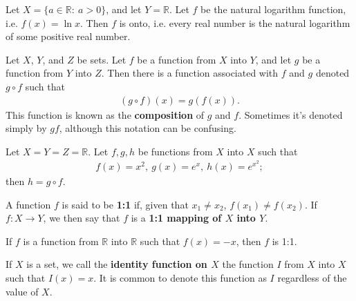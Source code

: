 \documentclass[12pt]{article}
\begin{document}
\begin{exm}
  Let $X = \{a \in \mathbb{R}:\ a > 0\}$, and let $Y = \mathbb{R}$. Let $f$ be the
  natural logarithm function, i.e. $f(x) = \ln x$. Then $f$ is onto, i.e. every real
  number is the natural logarithm of some positive real number.
\end{exm}

\begin{defn}
  Let $X$, $Y$, and $Z$ be sets. Let $f$ be a function from $X$ into $Y$, and let $g$
  be a function from $Y$ into $Z$. Then there is a function associated with $f$ and
  $g$ denoted $g \circ f$ such that
  \begin{align*}
    (g \circ f)(x) = g(f(x)).
  \end{align*}
  This function is known as the \textbf{composition} of $g$ and $f$. Sometimes it's
  denoted simply by $gf$, although this notation can be confusing.
\end{defn}

\begin{exm}
  Let $X = Y = Z = \mathbb{R}$. Let $f,g,h$ be functions from $X$ into $X$ such that
  \begin{align*}
    f(x) = x^2,\ g(x) = e^x,\ h(x) = e^{x^2};
  \end{align*}
  then $h = g \circ f$.
\end{exm}

\begin{defn}
  A function $f$ is said to be \textbf{1:1} if, given that $x_1 \neq x_2$, $f(x_1)
  \neq f(x_2)$. If $f: X \to Y$, we then say that $f$ is a \textbf{1:1 mapping of $X$
  into $Y$}.
\end{defn}

\begin{exm}
  If $f$ is a function from $\mathbb{R}$ into $\mathbb{R}$ such that $f(x) = -x$,
  then $f$ is 1:1.
\end{exm}

\begin{defn}
  If $X$ is a set, we call the \textbf{identity function on $X$} the function $I$
  from $X$ into $X$ such that $I(x) = x$. It is common to denote this function as $I$
  regardless of the value of $X$.
\end{defn}
\end{document}
